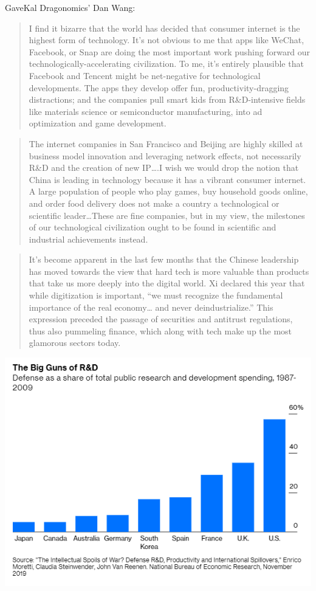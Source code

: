 \documentclass[
]{book}
\begin{document}
GaveKal Dragonomics' Dan Wang:

\begin{quote}
I find it bizarre that the world has decided that consumer internet is the highest form of technology. It's not obvious to me that apps like WeChat, Facebook, or Snap are doing the most important work pushing forward our technologically-accelerating civilization. To me, it's entirely plausible that Facebook and Tencent might be net-negative for technological developments. The apps they develop offer fun, productivity-dragging distractions; and the companies pull smart kids from R\&D-intensive fields like materials science or semiconductor manufacturing, into ad optimization and game development.
\end{quote}

\begin{quote}
The internet companies in San Francisco and Beijing are highly skilled at business model innovation and leveraging network effects, not necessarily R\&D and the creation of new IP\ldots.I wish we would drop the notion that China is leading in technology because it has a vibrant consumer internet. A large population of people who play games, buy household goods online, and order food delivery does not make a country a technological or scientific leader\ldots These are fine companies, but in my view, the milestones of our technological civilization ought to be found in scientific and industrial achievements instead.
\end{quote}

\begin{quote}
It's become apparent in the last few months that the Chinese leadership has moved towards the view that hard tech is more valuable than products that take us more deeply into the digital world. Xi declared this year that while digitization is important, ``we must recognize the fundamental importance of the real economy\ldots{} and never deindustrialize.'' This expression preceded the passage of securities and antitrust regulations, thus also pummeling finance, which along with tech make up the most glamorous sectors today.
\end{quote}

\includegraphics{fig/RD_Military_Share.png}
\end{document}
